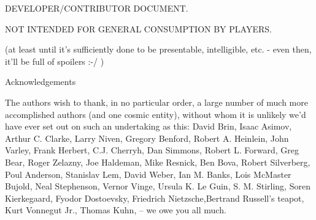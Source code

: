 \vspace{1cm}
\centerline{\LARGE DEVELOPER/CONTRIBUTOR DOCUMENT.}
\centerline{\LARGE NOT INTENDED FOR GENERAL CONSUMPTION BY PLAYERS.}
\vspace{0.5cm}
\centerline{(at least until it's sufficiently done to be presentable, intelligible, etc. - even then, it'll be full of spoilers :-/ )}
\vspace{3cm}
\clearpage
{\centerline{\LARGE Acknowledgements}}
\vspace{2cm}
{\rm 

The authors wish to thank, in no particular order, a large number of
much more accomplished authors (and one cosmic entity), without whom it is unlikely we'd have
ever set out on such an undertaking as this: David Brin, Isaac Asimov,
Arthur C. Clarke, Larry Niven, Gregory Benford, Robert A. Heinlein,
John Varley, Frank Herbert, C.J. Cherryh, Dan Simmons, Robert
L. Forward, Greg Bear, Roger Zelazny, Joe Haldeman, Mike Resnick, Ben
Bova, Robert Silverberg, Poul Anderson, Stanislav Lem, David Weber,
Ian M. Banks, Lois McMaster Bujold, Neal Stephenson, Vernor Vinge, Ursula K. Le Guin, S. M. Stirling, Soren Kierkegaard, Fyodor Dostoevsky, Friedrich Nietzsche,Bertrand Russell's teapot, Kurt Vonnegut Jr., Thomas Kuhn, -- we owe you all much.

}
